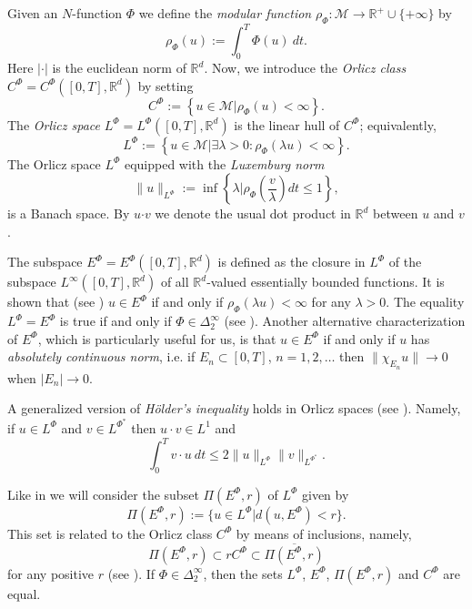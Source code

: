 \documentclass[twoside]{article}
\theoremstyle{remark}
\newcommand{\orlnor}{\|_{L^{\Phi}}}
\newcommand{\lphi}{L^{\Phi}}
\newcommand{\lpsi}{L^{\Phi^*}}
\newcommand{\ephi}{E^{\Phi}}
\newcommand{\claseor}{C^{\Phi}}
\renewcommand{\b}[1]{\boldsymbol{#1}}
\newcommand{\rr}{\mathbb{R}}
\renewcommand{\leq}{\leqslant}
\newcommand{\Phie}{\Phi^{*}}
\begin{document}
Given  an $N$-function $\Phi$ we define the \emph{modular function} 
$\rho_{\Phi}:\mathcal{M}\to \mathbb{R}^+\cup\{+\infty\}$ by
\[\rho_{\Phi}(u):= \int_0^T \Phi(u)\ dt.\]
Here $|\cdot|$ is the euclidean norm of $\mathbb{R}^d$.
Now, we introduce the \emph{Orlicz class} $C^{\Phi}=C^{\Phi}([0,T],\rr^d)$   by setting
\begin{equation}\label{claseOrlicz}
  C^{\Phi}:=\left\{u\in \mathcal{M} | \rho_{\Phi}(u)< \infty \right\}.
\end{equation}
The \emph{Orlicz space} $\lphi=L^{\Phi}([0,T],\rr^d)$ is the linear hull of $\claseor$;
equivalently,
\begin{equation}\label{espacioOrlicz}
\lphi:=\left\{ u\in \mathcal{M}| \exists \lambda>0: \rho_{\Phi}(\lambda u) < \infty   \right\}.
\end{equation}
  The Orlicz space $\lphi$ equipped with the \emph{Luxemburg norm}
\[
\|  u  \orlnor:=\inf \left\{ \lambda\bigg| \rho_{\Phi}\left(\frac{v}{\lambda}\right) dt\leq 1\right\},
\]
is a Banach space. By $u\b{\cdot} v$ we denote the usual dot product in $\mathbb{R}^{d}$ between $u$ and $v$.


The subspace $\ephi=\ephi([0,T],\rr^d)$ is defined as the closure in $\lphi$ of the subspace $L^{\infty}([0,T],\rr^d)$ of all $\mathbb{R}^d$-valued essentially bounded functions. It is shown that  (see \cite[Thm. 5.1]{Orliczvectorial2005}) $u\in\ephi$  if and only if $\rho_{\Phi}(\lambda u)<\infty$ for any $\lambda>0$. The equality $\lphi=\ephi$ is true if and only if $\Phi\in\Delta_2^{\infty}$ (see \cite[Thm. 5.2]{Orliczvectorial2005}). Another alternative characterization of $\ephi$, which is particularly useful for us, is that $u\in\ephi$ if and only if $u$ has  \emph{absolutely continuous norm}, i.e.   if $E_n\subset [0,T]$, $n=1,2,\ldots$ then $\|\chi_{E_n}u\|\to 0$ when $|E_n|\to 0$.

A generalized version of \emph{H\"older's inequality} holds in Orlicz spaces (see \cite[Thm. 4.1]{Skaff1969}). Namely, if $u\in\lphi$ and $v\in\lpsi$ then $u\cdot v\in L^1$ and
\begin{equation}\label{holder}
\int_0^Tv\cdot u\ dt\leq 2 \|u\orlnor\|v\|_{L^{\Phie}}.
\end{equation}


Like in \cite{KR} we will consider the subset $\Pi(\ephi,r)$ of $\lphi$ given by
\[\Pi(\ephi,r):=\{u\in\lphi| d(u,\ephi)<r\}.\]
This set is related to the Orlicz class $\claseor$ by means of inclusions, namely,
\begin{equation}\label{inclusiones}\Pi(\ephi, r )\subset r \claseor\subset\overline{\Pi(\ephi,r)}
\end{equation}
for any positive $r$ (see \cite[Thm. 5.6]{Orliczvectorial2005}).
If $\Phi \in \Delta_2^{\infty}$,  then the sets $\lphi$, $\ephi$, $\Pi(\ephi,r)$ and $\claseor$ are equal.
\end{document}
